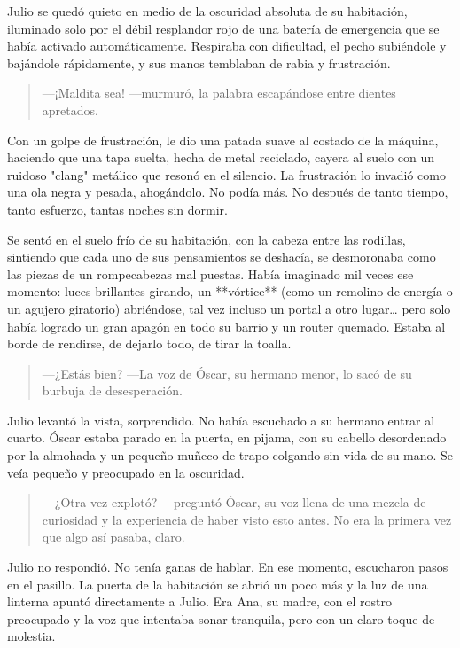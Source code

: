 \documentclass[a4paper,12pt]{book}
\begin{document}
Julio se quedó quieto en medio de la oscuridad absoluta de su habitación, iluminado solo por el débil resplandor rojo de una batería de emergencia que se había activado automáticamente. Respiraba con dificultad, el pecho subiéndole y bajándole rápidamente, y sus manos temblaban de rabia y frustración.

\begin{quote}
    —¡Maldita sea! —murmuró, la palabra escapándose entre dientes apretados.
\end{quote}

Con un golpe de frustración, le dio una patada suave al costado de la máquina, haciendo que una tapa suelta, hecha de metal reciclado, cayera al suelo con un ruidoso "clang" metálico que resonó en el silencio. La frustración lo invadió como una ola negra y pesada, ahogándolo. No podía más. No después de tanto tiempo, tanto esfuerzo, tantas noches sin dormir.

Se sentó en el suelo frío de su habitación, con la cabeza entre las rodillas, sintiendo que cada uno de sus pensamientos se deshacía, se desmoronaba como las piezas de un rompecabezas mal puestas. Había imaginado mil veces ese momento: luces brillantes girando, un **vórtice** (como un remolino de energía o un agujero giratorio) abriéndose, tal vez incluso un portal a otro lugar… pero solo había logrado un gran apagón en todo su barrio y un router quemado. Estaba al borde de rendirse, de dejarlo todo, de tirar la toalla.

\begin{quote}
    —¿Estás bien? —La voz de Óscar, su hermano menor, lo sacó de su burbuja de desesperación.
\end{quote}

Julio levantó la vista, sorprendido. No había escuchado a su hermano entrar al cuarto. Óscar estaba parado en la puerta, en pijama, con su cabello desordenado por la almohada y un pequeño muñeco de trapo colgando sin vida de su mano. Se veía pequeño y preocupado en la oscuridad.

\begin{quote}
    —¿Otra vez explotó? —preguntó Óscar, su voz llena de una mezcla de curiosidad y la experiencia de haber visto esto antes. No era la primera vez que algo así pasaba, claro.
\end{quote}

Julio no respondió. No tenía ganas de hablar. En ese momento, escucharon pasos en el pasillo. La puerta de la habitación se abrió un poco más y la luz de una linterna apuntó directamente a Julio. Era Ana, su madre, con el rostro preocupado y la voz que intentaba sonar tranquila, pero con un claro toque de molestia.
\end{document}
